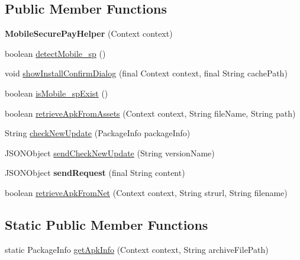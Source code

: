 \subsection*{Public Member Functions}
\begin{DoxyCompactItemize}
\item 
\mbox{\label{classorg_1_1cocos2dx_1_1plugin_1_1MobileSecurePayHelper_a1e016d7648380d0e241873d6dd23f6b3}} 
{\bfseries Mobile\+Secure\+Pay\+Helper} (Context context)
\item 
boolean \hyperlink{classorg_1_1cocos2dx_1_1plugin_1_1MobileSecurePayHelper_a628c0ba86a51a221b4614f1af0d8ed00}{detect\+Mobile\+\_\+sp} ()
\item 
void \hyperlink{classorg_1_1cocos2dx_1_1plugin_1_1MobileSecurePayHelper_a5b44f735dd270d3988e15469d74955ec}{show\+Install\+Confirm\+Dialog} (final Context context, final String cache\+Path)
\item 
boolean \hyperlink{classorg_1_1cocos2dx_1_1plugin_1_1MobileSecurePayHelper_acdc50e68e8616c5a460368ec93d6545a}{is\+Mobile\+\_\+sp\+Exist} ()
\item 
boolean \hyperlink{classorg_1_1cocos2dx_1_1plugin_1_1MobileSecurePayHelper_af7a5c38e1e1511eddac95dff96c88d4b}{retrieve\+Apk\+From\+Assets} (Context context, String file\+Name, String path)
\item 
String \hyperlink{classorg_1_1cocos2dx_1_1plugin_1_1MobileSecurePayHelper_a6f4d26833a00d643c2905cbd284df143}{check\+New\+Update} (Package\+Info package\+Info)
\item 
J\+S\+O\+N\+Object \hyperlink{classorg_1_1cocos2dx_1_1plugin_1_1MobileSecurePayHelper_a47c9a5ffceb0e55b5d640f7d25c03e87}{send\+Check\+New\+Update} (String version\+Name)
\item 
\mbox{\label{classorg_1_1cocos2dx_1_1plugin_1_1MobileSecurePayHelper_a000cd30fe9205cf213e824bcb385c49c}} 
J\+S\+O\+N\+Object {\bfseries send\+Request} (final String content)
\item 
boolean \hyperlink{classorg_1_1cocos2dx_1_1plugin_1_1MobileSecurePayHelper_a9bdc3b72944314390da509e2dd82cc9a}{retrieve\+Apk\+From\+Net} (Context context, String strurl, String filename)
\end{DoxyCompactItemize}
\subsection*{Static Public Member Functions}
\begin{DoxyCompactItemize}
\item 
static Package\+Info \hyperlink{classorg_1_1cocos2dx_1_1plugin_1_1MobileSecurePayHelper_ac21b567d772189c3ba57f140851ad7ed}{get\+Apk\+Info} (Context context, String archive\+File\+Path)
\end{DoxyCompactItemize}
